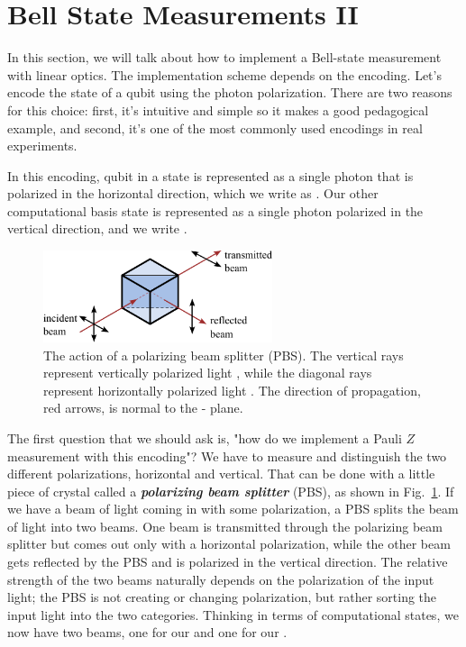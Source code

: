 \section{Bell State Measurements II}
\label{sec:13-3_Bell_state_measurement_2}

In this section, we will talk about how to implement a Bell-state measurement with linear optics. The implementation scheme depends on the encoding. Let's encode the state of a qubit using the photon polarization. There are two reasons for this choice: first, it's intuitive and simple so it makes a good pedagogical example, and second, it's one of the most commonly used encodings in real experiments.

In this encoding, qubit in a state  is represented as a single photon that is polarized in the horizontal direction, which we write as .
Our other computational basis state  is represented as a single photon polarized in the vertical direction, and we write .

\begin{figure}[t]
    \centering
    \includegraphics[width=0.6\textwidth]{lesson13/13-3_PBS.pdf}
    \caption[A polarizing beam splitter (PBS)]{The action of a polarizing beam splitter (PBS).  The vertical rays represent vertically polarized light , while the diagonal rays represent horizontally polarized light .  The direction of propagation, red arrows, is normal to the - plane.}
    \label{fig:13-PBS}
\end{figure}

The first question that we should ask is, "how do we implement a Pauli $Z$ measurement with this encoding"? We have to measure and distinguish the two different polarizations, horizontal and vertical. That can be done with a little piece of crystal called a \textit{\textbf{polarizing beam splitter}} (PBS), as shown in Fig.~\ref{fig:13-PBS}. If we have a beam of light coming in with some polarization, a PBS splits the beam of light into two beams. One beam is transmitted through the polarizing beam splitter but comes out only with a horizontal polarization, while the other beam gets reflected by the PBS and is polarized in the vertical direction. The relative strength of the two beams naturally depends on the polarization of the input light; the PBS is not creating or changing polarization, but rather sorting the input light into the two categories.
Thinking in terms of computational states, we now have two beams, one for our  and one for our .


